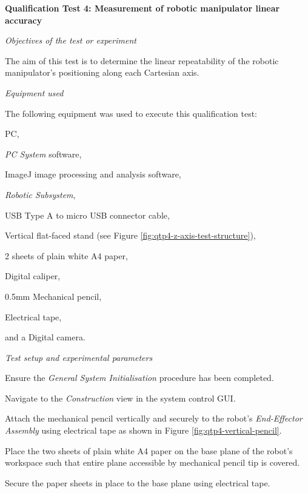 \textbf{Qualification Test 4: Measurement of robotic manipulator linear accuracy}

\textit{Objectives of the test or experiment}

The aim of this test is to determine the linear repeatability of the robotic manipulator's positioning along each Cartesian axis.

\textit{Equipment used}

The following equipment was used to execute this qualification test:

\begin{compactitem}
	\item PC,
	\item \textit{PC System} software,
	\item ImageJ image processing and analysis software,
	\item \textit{Robotic Subsystem},
	\item USB Type A to micro USB connector cable,
	\item Vertical flat-faced stand (see Figure \ref{fig:qtp4-z-axis-test-structure}),
	\item 2 sheets of plain white A4 paper,
	\item Digital caliper,
	\item 0.5mm Mechanical pencil,
	\item Electrical tape,
	\item and a Digital camera.
\end{compactitem}

\textit{Test setup and experimental parameters}

\begin{compactenum}
	\item Ensure the \textit{General System Initialisation} procedure has been completed.
	\item Navigate to the \textit{Construction} view in the system control GUI.
	\item Attach the mechanical pencil vertically and securely to the robot's \textit{End-Effector Assembly} using electrical tape as shown in Figure \ref{fig:qtp4-vertical-pencil}.
	\item Place the two sheets of plain white A4 paper on the base plane of the robot's workspace such that entire plane accessible by mechanical pencil tip is covered.
	\item Secure the paper sheets in place to the base plane using electrical tape.
\end{compactenum}

